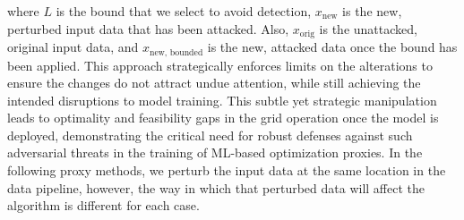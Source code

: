 \noindent where $L$ is the bound that we select to avoid detection, $x_\text{new}$ is the new, perturbed input data that has been attacked. Also, $x_\text{orig}$ is the unattacked, original input data, and $x_\text{new, bounded}$ is the new, attacked data once the bound has been applied. This approach strategically enforces limits on the alterations to ensure the changes do not attract undue attention, while still achieving the intended disruptions to model training. This subtle yet strategic manipulation leads to optimality and feasibility gaps in the grid operation once the model is deployed, demonstrating the critical need for robust defenses against such adversarial threats in the training of ML-based optimization proxies. In the following proxy methods, we perturb the input data at the same location in the data pipeline, however, the way in which that perturbed data will affect the algorithm is different for each case. 